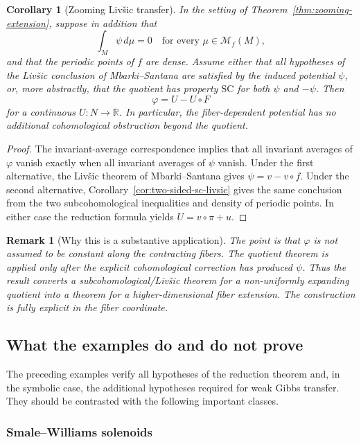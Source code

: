 \documentclass[11pt,a4paper]{article}
\newtheorem{corollary}[theorem]{Corollary}
\newtheorem{remark}[theorem]{Remark}
\begin{document}
\begin{corollary}[Zooming Liv\v{s}ic transfer]
\label{cor:zooming-liv-trans}
In the setting of Theorem~\ref{thm:zooming-extension}, suppose in addition
that
\[
\int_M\psi\,d\mu=0
\quad\text{for every }\mu\in\mathcal M_f(M),
\]
and that the periodic points of $f$ are dense. Assume either that all
hypotheses of the Liv\v{s}ic conclusion of Mbarki--Santana
\cite{MbarkiSantana} are satisfied by the induced potential $\psi$, or, more
abstractly, that the quotient has property $\mathrm{SC}$ for both $\psi$ and
$-\psi$. Then
\[
\varphi=U-U\circ F
\]
for a continuous $U:N\to\mathbb R$. In particular, the fiber-dependent
potential has no additional cohomological obstruction beyond the quotient.
\end{corollary}

\begin{proof}
The invariant-average correspondence implies that all invariant averages of
$\varphi$ vanish exactly when all invariant averages of $\psi$ vanish. Under
the first alternative, the Liv\v{s}ic theorem of Mbarki--Santana gives
$\psi=v-v\circ f$. Under the second alternative,
Corollary~\ref{cor:two-sided-sc-livsic} gives the same
conclusion from the two subcohomological inequalities and density of periodic
points. In either case the reduction formula yields
$U=v\circ\pi+u$.
\end{proof}

\begin{remark}[Why this is a substantive application]
The point is that $\varphi$ is not assumed to be constant along the
contracting fibers. The quotient theorem is applied only after the explicit
cohomological correction has produced $\psi$. Thus the result converts a
subcohomological/Liv\v{s}ic theorem for a non-uniformly expanding quotient
into a theorem for a higher-dimensional fiber extension. The construction is
fully explicit in the fiber coordinate.
\end{remark}

\subsection{What the examples do and do not prove}

The preceding examples verify all hypotheses of the reduction theorem and,
in the symbolic case, the additional hypotheses required for weak Gibbs
transfer. They should be contrasted with the following important classes.

\subsubsection{Smale--Williams solenoids}
\end{document}
